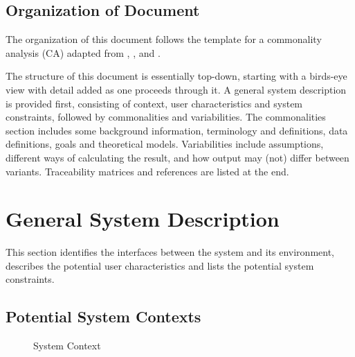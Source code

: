 \documentclass[12pt]{article}
\newcommand{\famname}{RK Generator} %
\begin{document}
\subsection{Organization of Document}
The organization of this document follows the template for a commonality 
analysis (CA)   adapted from 
\cite{Lai2004}, \cite{SmithAndLai2005}, \cite{Smith2006} and 
\cite{SmithEtAl2007}.

The structure of this document is essentially top-down, starting with a 
birds-eye view with detail added as 
one proceeds through it. A general system description is provided first, 
consisting of context, user characteristics and system constraints,
followed by commonalities and variabilities. The commonalities section includes 
some background information, terminology and definitions, data definitions, 
goals and theoretical models. Variabilities include assumptions, different ways 
of calculating the result, and how output may (not) differ between variants.
Traceability matrices and references are listed at the end.

\section{General System Description}

This section identifies the interfaces between the system and its environment,
describes the potential user characteristics and lists the potential system
constraints.

\subsection{Potential System Contexts}

\begin{figure}[htb]
    \centering
{}
\caption{System Context}
\label{fig:systemcontext}
\end{figure}
\end{document}
